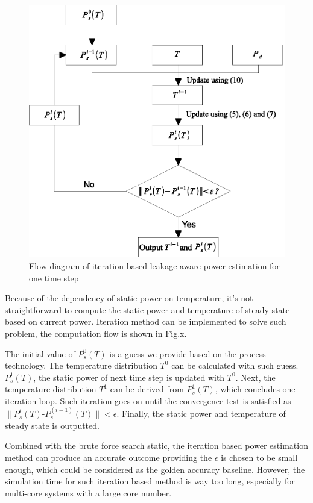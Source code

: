 \begin{figure}
\centering
\includegraphics[width=1\linewidth]{fig/iteration_flow.eps}
\caption{Flow diagram of iteration based leakage-aware power estimation for one time step}
\end{figure}


Because of the dependency of static power on temperature, it's not straightforward to compute the static power and temperature of steady state based on current power. Iteration method can be implemented to solve such problem, the computation flow is shown in Fig.x.

The initial value of $P^0_s(T)$ is a guess we provide based on the process technology. The temperature distribution $T^0$ can be calculated with such guess. $P^1_s(T)$, the static power of next time step is updated with $T^0$. Next, the temperature distribution $T^1$ can be derived from $P^1_s(T)$, which concludes one iteration loop. Such iteration goes on until the convergence test is satisfied as $\| P^i_s(T)$-$P^(i-1)_s(T)\|<\epsilon$. Finally, the static power and temperature of steady state is outputted.

Combined with the brute force search static, the iteration based power estimation method can produce an accurate outcome providing the $\epsilon$ is chosen to be small enough, which could be considered as the golden accuracy baseline. However, the simulation time for such iteration based method is way too long, especially for multi-core systems with a large core number. 

